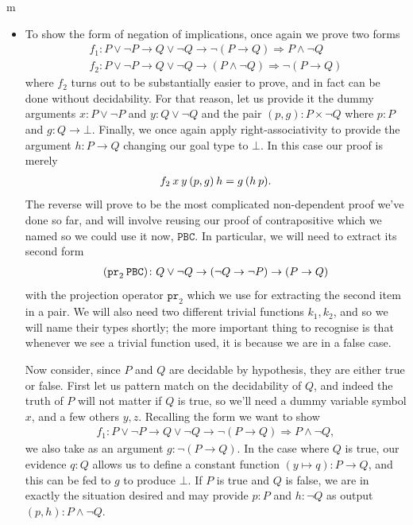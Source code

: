 \documentclass[11pt]{article}
\begin{document}
\begin{my proof}{m}
\begin{itemize}
\item To show the form of negation of implications, once again we prove two forms \begin{gather*}
f_1 \colon P \vee \neg P \to Q \vee \neg Q \to \neg (P \to Q) \Rightarrow P \wedge \neg Q \\
f_2 \colon P \vee \neg P \to Q \vee \neg Q \to (P \wedge \neg Q) \Rightarrow \neg (P \to Q)
\end{gather*}
where $f_2$ turns out to be substantially easier to prove, and in fact can be done without decidability. For that reason, let us provide it the dummy arguments $x \colon P \vee \neg P$ and $y \colon Q \vee \neg Q$ and the pair $(p, g) \colon P \times \neg Q$ where $p \colon P$ and $g \colon Q \to \bot$. Finally, we once again apply right-associativity to provide the argument $h \colon P \to Q$ changing our goal type to $\bot$. In this case our proof is merely \begin{gather*}
f_2 \hspace{0.2em} x \hspace{0.2em} y \hspace{0.2em} (p , g) \hspace{0.2em} h = g \hspace{0.2em} (h \hspace{0.2em} p).
\end{gather*}
The reverse will prove to be the most complicated non-dependent proof we've done so far, and will involve reusing our proof of contrapositive which we named so we could use it now, $\mathtt{PBC}$. In particular, we will need to extract its second form \begin{gather*}
(\mathtt{pr}_2 \hspace{0.2em} \mathtt{PBC}) \colon Q \vee \neg Q \to (\neg Q \to \neg P ) \to (P \to Q)
\end{gather*}
with the projection operator $\mathtt{pr}_2$ which we use for extracting the second item in a pair. We will also need two different trivial functions $k_1,k_2$, and so we will name their types shortly; the more important thing to recognise is that whenever we see a trivial function used, it is because we are in a false case.

Now consider, since $P$ and $Q$ are decidable by hypothesis, they are either true or false. First let us pattern match on the decidability of $Q$, and indeed the truth of $P$ will not matter if $Q$ is true, so we'll need a dummy variable symbol $x$, and a few others $y,z$. Recalling the form we want to show \begin{gather*}
f_1 \colon P \vee \neg P \to Q \vee \neg Q \to \neg (P \to Q) \Rightarrow P \wedge \neg Q,
\end{gather*}
we also take as an argument $g \colon \neg (P \to Q)$. In the case where $Q$ is true, our evidence $q \colon Q$ allows us to define a constant function $(y \mapsto q) \colon P \to Q$, and this can be fed to $g$ to produce $\bot$. If $P$ is true and $Q$ is false, we are in exactly the situation desired and may provide $p \colon P$ and $h \colon \neg Q$ as output $(p,h) \colon P \wedge \neg Q$.


\end{itemize}
\end{my proof}
\end{document}
